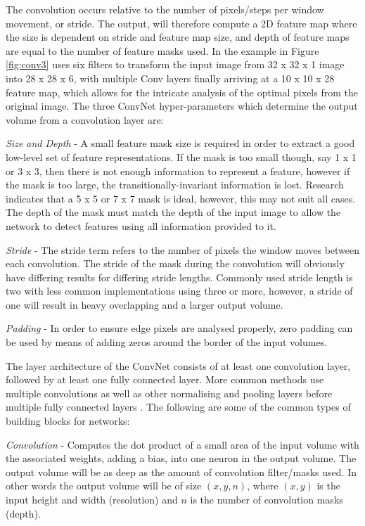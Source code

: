 \documentclass[fleqn,twoside,12pt]{report}
\begin{document}
The convolution occurs relative to the number of pixels/steps per window movement, or stride. The output, will therefore compute a 2D feature map where the size is dependent on stride and feature map size, and depth of feature maps are equal to the number of feature masks used. In the example in Figure \ref{fig:conv3} uses six filters to transform the input image from 32 x 32 x 1 image into 28 x 28 x 6, with multiple Conv layers finally arriving at a 10 x 10 x 28 feature map, which allows for the intricate analysis of the optimal pixels from the original image. The three ConvNet hyper-parameters which determine the output volume from a convolution layer are:

\textit{Size and Depth} - A small feature mask size is required in order to extract a good low-level set of feature representations. If the mask is too small though, say 1 x 1 or 3 x 3, then there is not enough information to represent a feature, however if the mask is too large, the transitionally-invariant information is lost. Research indicates that a 5 x 5 or 7 x 7 mask is ideal, however, this may not suit all cases. The depth of the mask must match the depth of the input image to allow the network to detect features using all information provided to it.

\textit{Stride} - The stride term refers to the number of pixels the window moves between each convolution. The stride of the mask during the convolution will obviously have differing results for differing stride lengths. Commonly used stride length is two with less common implementations using three or more, however, a stride of one will result in heavy overlapping and a larger output volume.

\textit{Padding} - In order to ensure edge pixels are analysed properly, zero padding can be used by means of adding zeros around the border of the input volumes.  

The layer architecture of the ConvNet consists of at least one convolution layer, followed by at least one fully connected layer. More common methods use multiple convolutions as well as other normalising and pooling layers before multiple fully connected layers \cite{krizhevsky,ciresan}. The following are some of the common types of building blocks for networks: 

\textit{Convolution} - Computes the dot product of a small area of the input volume with the associated weights, adding a bias, into one neuron in the output volume. The output volume will be as deep as the amount of convolution filter/masks used. In other words the output volume will be of size $(x,y,n)$, where $(x,y)$ is the input height and width (resolution) and $n$ is the number of convolution masks (depth).
\end{document}
